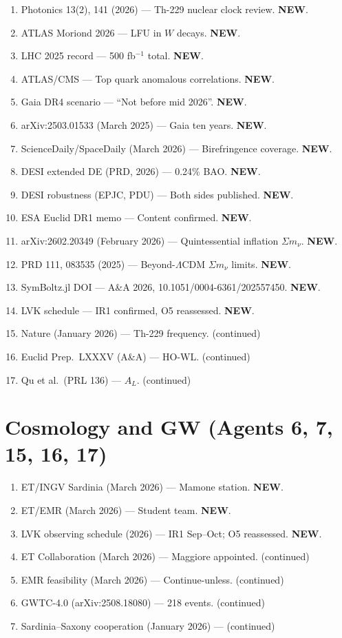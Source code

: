 \documentclass[11pt,a4paper]{article}
\newcommand{\NEW}{\textcolor{dfdblue}{\textbf{NEW}}}
\begin{document}
\begin{enumerate}
\item Photonics 13(2), 141 (2026) --- Th-229 nuclear clock review. \NEW.
\item ATLAS Moriond 2026 --- LFU in $W$ decays. \NEW.
\item LHC 2025 record --- 500 fb$^{-1}$ total. \NEW.
\item ATLAS/CMS --- Top quark anomalous correlations. \NEW.
\item Gaia DR4 scenario --- ``Not before mid 2026''. \NEW.
\item arXiv:2503.01533 (March 2025) --- Gaia ten years. \NEW.
\item ScienceDaily/SpaceDaily (March 2026) --- Birefringence coverage. \NEW.
\item DESI extended DE (PRD, 2026) --- 0.24\% BAO. \NEW.
\item DESI robustness (EPJC, PDU) --- Both sides published. \NEW.
\item ESA Euclid DR1 memo --- Content confirmed. \NEW.
\item arXiv:2602.20349 (February 2026) --- Quintessential inflation $\Sigma m_\nu$. \NEW.
\item PRD 111, 083535 (2025) --- Beyond-$\Lambda$CDM $\Sigma m_\nu$ limits. \NEW.
\item SymBoltz.jl DOI --- A\&A 2026, 10.1051/0004-6361/202557450. \NEW.
\item LVK schedule --- IR1 confirmed, O5 reassessed. \NEW.
\item Nature (January 2026) --- Th-229 frequency. (continued)
\item Euclid Prep.\ LXXXV (A\&A) --- HO-WL. (continued)
\item Qu et al.\ (PRL 136) --- $A_L$. (continued)
\end{enumerate}

\section{Cosmology and GW (Agents 6, 7, 15, 16, 17)}

\begin{enumerate}
\item ET/INGV Sardinia (March 2026) --- Mamone station. \NEW.
\item ET/EMR (March 2026) --- Student team. \NEW.
\item LVK observing schedule (2026) --- IR1 Sep--Oct; O5 reassessed. \NEW.
\item ET Collaboration (March 2026) --- Maggiore appointed. (continued)
\item EMR feasibility (March 2026) --- Continue-unless. (continued)
\item GWTC-4.0 (arXiv:2508.18080) --- 218 events. (continued)
\item Sardinia--Saxony cooperation (January 2026) --- (continued)
\end{enumerate}
\end{document}
